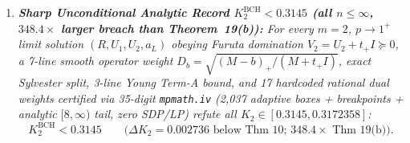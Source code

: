\documentclass[10pt,letterpaper]{article}
\newcommand{\op}{\mathrm{op}}
\begin{document}
\begin{tcolorbox}[mathbox]
\begin{enumerate}[label=(\alph*),leftmargin=1.8em,itemsep=2pt,topsep=2pt]
  \begin{equation}\label{eq:bch_norm_cap}
    \|V\|_{\op} \le 13.412 \;\;(\forall K_2 \in [0, 0.3172358]),
    \quad \le 11.390 \;\text{ at } 0.3172358,
    \quad \le 10.619 \;\text{ at } K_2^{\mathrm{tree}}(\infty),
  \end{equation}
  \emph{eliminating the unbounded $U$-ray obstruction and making BCH moment SDPs Archimedean-compact.}
  \item \emph{\textbf{Sharp Unconditional Analytic Record $K_2^{\mathrm{BCH}} < 0.3145$ (all $n \le \infty$, $348.4\times$ larger breach than Theorem~19(b)):} For every $m = 2$, $p \to 1^+$ limit solution $(R, U_1, U_2, a_L)$ obeying Furuta domination $V_2 = U_2 + t_+ I \succeq 0$, a 7-line smooth operator weight $D_b = \sqrt{(M-b)_+/(M+t_+ I)}$, exact Sylvester split, 3-line Young Term-A bound, and 17 hardcoded rational dual weights certified via 35-digit \texttt{mpmath.iv} (2{,}037 adaptive boxes + breakpoints + analytic $[8,\infty)$ tail, zero SDP/LP) refute all $K_2 \in [0.3145, 0.3172358]$:}
  \begin{equation}\label{eq:bch_record}
    K_2^{\mathrm{BCH}} < 0.3145 \qquad \bigl(\Delta K_2 = 0.002736 \text{ below Thm~10;\ } 348.4\times \text{ Thm~19(b)}\bigr).
  \end{equation}
\end{enumerate}
\end{tcolorbox}
\end{document}
